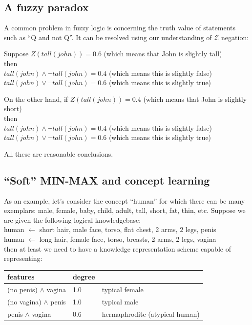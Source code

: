 \subsection{A fuzzy paradox}

A common problem in fuzzy logic is concerning the truth value of statements such as ``Q and not Q''.  It can be resolved using our understanding of $\mathcal{Z}$ negation:

Suppose $Z(tall(john)) = 0.6$ (which means that John is slightly tall)\\
then\\
\hspace*{1cm} $ tall(john) \wedge \neg tall(john) = 0.4$ (which means this is slightly false)\\
\hspace*{1cm} $ tall(john) \vee \neg tall(john) = 0.6$ (which means this is slightly true)

On the other hand, if $Z(tall(john)) = 0.4$ (which means that John is slightly short)\\
then\\
\hspace*{1cm} $ tall(john) \wedge \neg tall(john) = 0.4$ (which means this is slightly false)\\
\hspace*{1cm} $ tall(john) \vee \neg tall(john) = 0.6$ (which means this is slightly true)

All these are reasonable conclusions.

\subsection{``Soft'' MIN-MAX and concept learning}

As an example, let's consider the concept ``human'' for which there can be many exemplars: male, female, baby, child, adult, tall, short, fat, thin, etc.  Suppose we are given the following logical knowledgebase:\\
\hspace*{1cm} human $\leftarrow$ short hair, male face, torso, flat chest, 2 arms, 2 legs, penis\\
\hspace*{1cm} human $\leftarrow$ long hair, female face, torso, breasts, 2 arms, 2 legs, vagina\\
then at least we need to have a knowledge representation scheme capable of representing:

\hspace*{1cm} \begin{tabular}{|l|l|l|} \hline
\textbf{features}           & \textbf{degree} &\\ \hline
(no penis) $\wedge$ vagina  & 1.0             & typical female\\
(no vagina) $\wedge$ penis  & 1.0             & typical male\\
penis $\wedge$ vagina       & 0.6             & hermaphrodite (atypical human)\\
\hline
\end{tabular}

